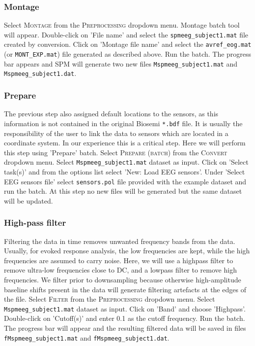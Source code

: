 \subsubsection{Montage}
Select \textsc{Montage} from the \textsc{Preprocessing} dropdown menu. Montage batch tool will appear. Double-click on 'File name' and select the \texttt{spmeeg\_subject1.mat} file created by conversion. Click on 'Montage file name' and select the \texttt{avref\_eog.mat} (or \texttt{MONT\_EXP.mat}) file generated as described above. Run the batch. The progress bar appears and SPM will generate two new files \texttt{Mspmeeg\_subject1.mat} and \texttt{Mspmeeg\_subject1.dat}.

\subsubsection{Prepare}
The previous step also assigned default locations to the sensors, as this information is not contained in the original Biosemi \texttt{*.bdf} file. It is usually the responsibility of the user to link the data to sensors which are located in a coordinate system. In our experience this is a critical step. Here we will perform this step using 'Prepare' batch. Select \textsc{Prepare (batch)} from the \textsc{Convert} dropdown menu. Select \texttt{Mspmeeg\_subject1.mat} dataset as input. Click on 'Select task(s)' and from the options list select 'New: Load EEG sensors'. Under 'Select EEG sensors file' select \texttt{sensors.pol} file provided with the example dataset and run the batch. At this step no new files will be generated but the same dataset will be updated.

\subsubsection{High-pass filter}
Filtering the data in time removes unwanted frequency bands from the data. Usually, for evoked response analysis, the low frequencies are kept, while the high frequencies are assumed to carry noise. Here, we will use a highpass filter to remove ultra-low frequencies close to DC, and a lowpass filter to remove high frequencies. We filter prior to downsampling because otherwise high-amplitude baseline shifts present in the data will generate filtering artefacts at the edges of the file. Select \textsc{Filter} from the \textsc{Preprocessing} dropdown menu. Select \texttt{Mspmeeg\_subject1.mat} dataset as input.  Click on 'Band' and choose 'Highpass'. Double-click on 'Cutoff(s)' and enter 0.1 as the cutoff frequency. Run the batch. The progress bar will appear and the resulting filtered data will be saved in files \texttt{fMspmeeg\_subject1.mat} and \texttt{fMspmeeg\_subject1.dat}.

